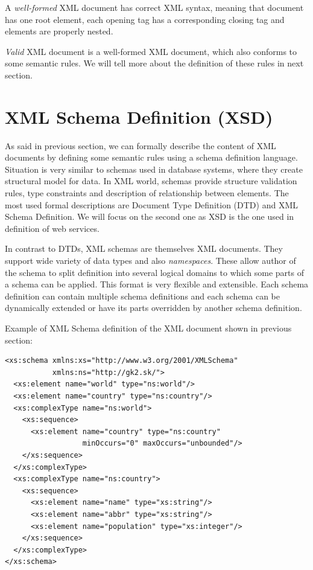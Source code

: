 \documentclass[12pt,notitlepage]{report}
\begin{document}
A \textit{well-formed} XML document has correct XML syntax, meaning that document has one root element, each opening tag has a corresponding closing tag and elements are properly nested.

\textit{Valid} XML document is a well-formed XML document, which also conforms to some semantic rules. We will tell more about the definition of these rules in next section.

\section{XML Schema Definition (XSD)}

As said in previous section, we can formally describe the content of XML documents by defining some semantic rules using a schema definition language. Situation is very similar to schemas used in database systems, where they create structural model for data. In XML world, schemas provide structure validation rules, type constraints and description of relationship between elements. The most used formal descriptions are Document Type Definition (DTD)\cite{w3c-xml} and XML Schema Definition\cite{w3c-xsd0}. We will focus on the second one as XSD is the one used in definition of web services.

In contrast to DTDs, XML schemas are themselves XML documents. They support wide variety of data types\cite{w3c-xsd2} and also \textit{namespaces}\cite{w3c-xsd1}. These allow author of the schema to split definition into several logical domains to which some parts of a schema can be applied. This format is very flexible and extensible. Each schema definition can contain multiple schema definitions and each schema can be dynamically extended or have its parts overridden by another schema definition.

Example of XML Schema definition of the XML document shown in previous section:

\begin{small}
\begin{verbatim}
<xs:schema xmlns:xs="http://www.w3.org/2001/XMLSchema"
           xmlns:ns="http://gk2.sk/">
  <xs:element name="world" type="ns:world"/>
  <xs:element name="country" type="ns:country"/>
  <xs:complexType name="ns:world">
    <xs:sequence>
      <xs:element name="country" type="ns:country"
                  minOccurs="0" maxOccurs="unbounded"/>
    </xs:sequence>
  </xs:complexType>
  <xs:complexType name="ns:country">
    <xs:sequence>
      <xs:element name="name" type="xs:string"/>
      <xs:element name="abbr" type="xs:string"/>
      <xs:element name="population" type="xs:integer"/>
    </xs:sequence>
  </xs:complexType>
</xs:schema>
\end{verbatim}
\end{small}
\end{document}
